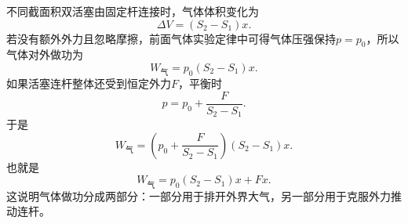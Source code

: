 \begin{casetypebox}[title={\strut\textcolor{white}{\bfseries 常见题型：不同截面积双活塞做功}}]
  不同截面积双活塞由固定杆连接时，气体体积变化为
  \[
    \Delta V=(S_2-S_1)x.
  \]
  若没有额外外力且忽略摩擦，前面气体实验定律中可得气体压强保持$p=p_0$，所以气体对外做功为
  \[
    W_{\text{气}}=p_0(S_2-S_1)x.
  \]
  如果活塞连杆整体还受到恒定外力$F$，平衡时
  \[
    p=p_0+\frac{F}{S_2-S_1}.
  \]
  于是
  \[
    W_{\text{气}}=\left(p_0+\frac{F}{S_2-S_1}\right)(S_2-S_1)x.
  \]
  也就是
  \[
    W_{\text{气}}=p_0(S_2-S_1)x+Fx.
  \]
  这说明气体做功分成两部分：一部分用于排开外界大气，另一部分用于克服外力推动连杆。
\end{casetypebox}
